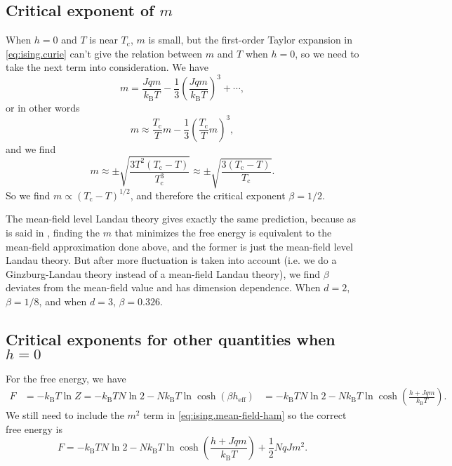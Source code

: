 \documentclass[hyperref, a4paper]{article}
\def\\{}%
\newcommand*{\Tc}{T_{\text{c}}}
\newcommand*{\kB}{k_{\text{B}}}
\begin{document}
\subsection{Critical exponent of $m$}

When $h = 0$ and $T$ is near $\Tc$, 
$m$ is small,
but the first-order Taylor expansion in \eqref{eq:ising.curie} 
can't give the relation between $m$ and $T$ when $h = 0$, 
so we need to take the next term into consideration. 
We have 
\[
    m = \frac{J q m}{\kB T} - \frac{1}{3} \left(
        \frac{J q m}{\kB T}
    \right)^3 + \cdots, 
\]
or in other words 
\[
    m \approx \frac{\Tc}{T} m - \frac{1}{3} \left(
        \frac{\Tc}{T} m
    \right)^3,
\]
and we find 
\begin{equation}
    m \approx \pm \sqrt{
        \frac{3 T^2 (\Tc - T)}{\Tc^3} 
    } \approx \pm \sqrt{
        \frac{3 (\Tc - T)}{\Tc} 
    }.
    \label{eq:ising.mf.m}
\end{equation}
So we find $m \propto (\Tc - T)^{1/2}$, 
and therefore the critical exponent $\beta = 1/2$.

The mean-field level Landau theory gives exactly the same prediction, 
because as is said in , 
finding the $m$ that minimizes the free energy 
is equivalent to the mean-field approximation done above, 
and the former is just the mean-field level Landau theory. 
But after more fluctuation is taken into account 
(i.e. we do a Ginzburg-Landau theory instead of a mean-field Landau theory), 
we find $\beta$ deviates from the mean-field value and 
has dimension dependence.
When $d = 2$, $\beta = 1/8$, 
and when $d = 3$, $\beta = 0.326$.

\subsection{Critical exponents for other quantities when $h = 0$}

For the free energy, we have 
\begin{equation}
    \begin{aligned}
        F &= - \kB T \ln Z = - \kB T N \ln 2 - N \kB T \ln \cosh (\beta h_{\text{eff}}) \\
        &= - \kB T N \ln 2 - N \kB T \ln \cosh (
            \frac{h + Jq m}{\kB T}
        ).
    \end{aligned}
\end{equation}
We still need to include the $m^2$ term in \eqref{eq:ising.mean-field-ham}
so the correct free energy is 
\begin{equation}
    F = - \kB T N \ln 2 - N \kB T \ln \cosh (
        \frac{h + Jq m}{\kB T}
    ) + \frac{1}{2} N q J m^2.
    \label{eq:ising.full-mf-free-energy}
\end{equation}
\end{document}

